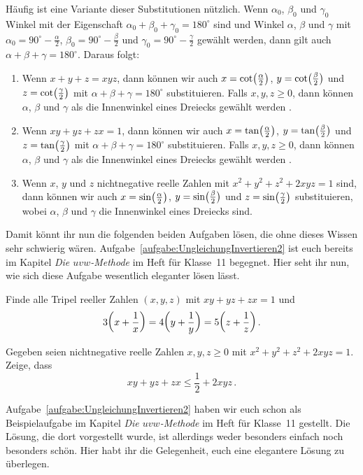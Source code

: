 Häufig ist eine Variante dieser Substitutionen nützlich. Wenn $\alpha_0$, $\beta_0$ und $\gamma_0$ Winkel mit der Eigenschaft $\alpha_0+\beta_0+\gamma_0=180^\circ$ sind und Winkel $\alpha$, $\beta$ und $\gamma$ mit $\alpha_0=90^\circ-\frac\alpha2$, $\beta_0=90^\circ-\frac\beta2$ und $\gamma_0=90^\circ-\frac\gamma2$ gewählt werden, dann gilt auch $\alpha+\beta+\gamma=180^\circ$. Daraus folgt:
\begin{enumerate}[label={$(\alph*)$},ref={$(\alph*)$}]\itshape
	\item Wenn $x+y+z=xyz$, dann können wir auch $x=\cot\parens[\big]{\frac{\alpha}2}$, $y=\cot\parens[\big]{\frac{\beta}2}$ und $z=\cot\parens[\big]{\frac{\gamma}2}$ mit $\alpha+\beta+\gamma=180^\circ$ substituieren. Falls $x,y,z\geqslant 0$, dann können $\alpha$, $\beta$ und $\gamma$ als die Innenwinkel eines Dreiecks gewählt werden .
	\item Wenn $xy+yz+zx=1$, dann können wir auch $x=\tan\parens[\big]{\frac{\alpha}2}$, $y=\tan\parens[\big]{\frac{\beta}2}$ und $z=\tan\parens[\big]{\frac{\gamma}2}$ mit $\alpha+\beta+\gamma=180^\circ$ substituieren. Falls $x,y,z\geqslant 0$, dann können $\alpha$, $\beta$ und $\gamma$ als die Innenwinkel eines Dreiecks gewählt werden .
	\item Wenn $x$, $y$ und $z$ nichtnegative reelle Zahlen mit $x^2+y^2+z^2+2xyz=1$ sind, dann können wir auch $x=\sin\parens[\big]{\frac{\alpha}2}$, $y=\sin\parens[\big]{\frac{\beta}2}$ und $z=\sin\parens[\big]{\frac{\gamma}2}$ substituieren, wobei $\alpha$, $\beta$ und $\gamma$ die Innenwinkel eines Dreiecks sind.
\end{enumerate}
Damit könnt ihr nun die folgenden beiden Aufgaben lösen, die ohne dieses Wissen sehr schwierig wären. Aufgabe~\ref{aufgabe:UngleichungInvertieren2} ist euch bereits im Kapitel \emph{Die $uvw$-Methode} im Heft für Klasse~11 begegnet. Hier seht ihr nun, wie sich diese Aufgabe wesentlich eleganter lösen lässt.
\begin{aufgabe*}\label{aufgabe:521236}
	Finde alle Tripel reeller Zahlen $(x,y,z)$ mit $xy+yz+zx=1$ und
	\begin{equation*}
		3\parens*{x+\frac 1x}=4\parens*{y+\frac 1y}=5\parens*{z+\frac 1z}\,.
	\end{equation*}
\end{aufgabe*}
\begin{aufgabe*}[*]\label{aufgabe:UngleichungInvertieren2}
	Gegeben seien nichtnegative reelle Zahlen $x,y,z\geqslant 0$ mit $x^2+y^2+z^2+2xyz=1$. Zeige, dass
	\begin{equation*}
		xy+yz+zx\leqslant \frac12+2xyz\,.
	\end{equation*}
\end{aufgabe*}
Aufgabe~\ref{aufgabe:UngleichungInvertieren2} haben wir euch schon als Beispielaufgabe im Kapitel \emph{Die $uvw$-Methode} im Heft für Klasse~11 gestellt. Die Lösung, die dort vorgestellt wurde, ist allerdings weder besonders einfach noch besonders schön. Hier habt ihr die Gelegenheit, euch eine elegantere Lösung zu überlegen.

